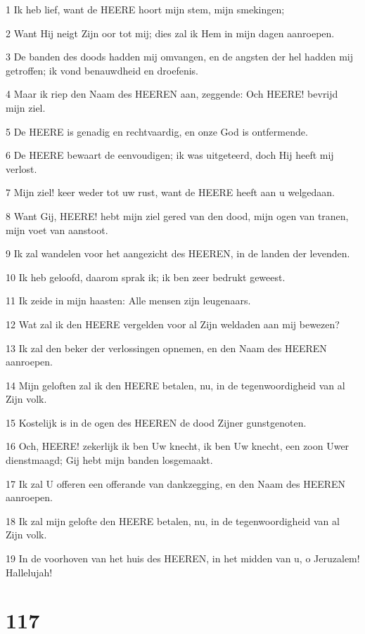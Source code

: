 \par 1 Ik heb lief, want de HEERE hoort mijn stem, mijn smekingen;
\par 2 Want Hij neigt Zijn oor tot mij; dies zal ik Hem in mijn dagen aanroepen.
\par 3 De banden des doods hadden mij omvangen, en de angsten der hel hadden mij getroffen; ik vond benauwdheid en droefenis.
\par 4 Maar ik riep den Naam des HEEREN aan, zeggende: Och HEERE! bevrijd mijn ziel.
\par 5 De HEERE is genadig en rechtvaardig, en onze God is ontfermende.
\par 6 De HEERE bewaart de eenvoudigen; ik was uitgeteerd, doch Hij heeft mij verlost.
\par 7 Mijn ziel! keer weder tot uw rust, want de HEERE heeft aan u welgedaan.
\par 8 Want Gij, HEERE! hebt mijn ziel gered van den dood, mijn ogen van tranen, mijn voet van aanstoot.
\par 9 Ik zal wandelen voor het aangezicht des HEEREN, in de landen der levenden.
\par 10 Ik heb geloofd, daarom sprak ik; ik ben zeer bedrukt geweest.
\par 11 Ik zeide in mijn haasten: Alle mensen zijn leugenaars.
\par 12 Wat zal ik den HEERE vergelden voor al Zijn weldaden aan mij bewezen?
\par 13 Ik zal den beker der verlossingen opnemen, en den Naam des HEEREN aanroepen.
\par 14 Mijn geloften zal ik den HEERE betalen, nu, in de tegenwoordigheid van al Zijn volk.
\par 15 Kostelijk is in de ogen des HEEREN de dood Zijner gunstgenoten.
\par 16 Och, HEERE! zekerlijk ik ben Uw knecht, ik ben Uw knecht, een zoon Uwer dienstmaagd; Gij hebt mijn banden losgemaakt.
\par 17 Ik zal U offeren een offerande van dankzegging, en den Naam des HEEREN aanroepen.
\par 18 Ik zal mijn gelofte den HEERE betalen, nu, in de tegenwoordigheid van al Zijn volk.
\par 19 In de voorhoven van het huis des HEEREN, in het midden van u, o Jeruzalem! Hallelujah!

\chapter{117}

